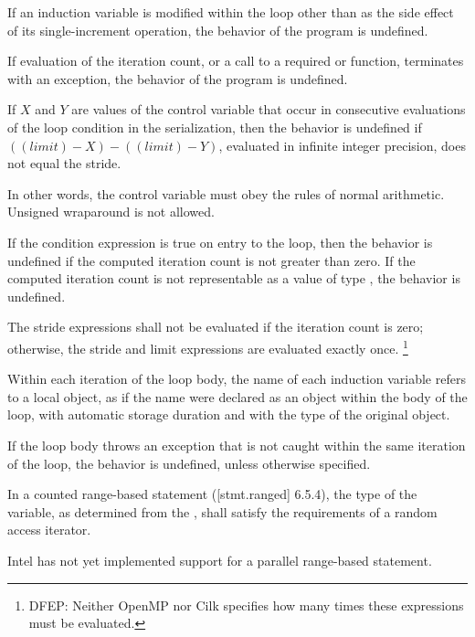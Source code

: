 
\pnum
If an induction variable is modified within the loop
other than as the side effect of its single-increment operation,
the behavior of the program is undefined.%

\begin{cpp}
If evaluation of the iteration count,
or a call to a required
or
function,
terminates with an exception,
the behavior of the program is undefined.
\end{cpp}

\pnum
If $X$ and $Y$ are values of the control variable
that occur in consecutive evaluations of the loop condition
in the serialization,
then the behavior is undefined if
$((limit) - X) - ((limit) - Y)$,
evaluated in infinite integer precision,
does not equal the stride.

\begin{note}
In other words, the control variable must obey the rules of normal arithmetic.
Unsigned wraparound is not allowed.
\end{note}

\pnum
If the condition expression is true on entry to the loop,
then the behavior is undefined
if the computed iteration count is not greater than zero.
If the computed iteration count is not representable
as a value of type
,
the behavior is undefined.


\pnum
The stride expressions shall not be evaluated if the iteration count is zero;
otherwise,
the stride and limit expressions are evaluated exactly once.%
\footnote{DFEP:
Neither OpenMP nor Cilk specifies
how many times these expressions must be evaluated.
}

\pnum
Within each iteration of the loop body,
the name of each induction variable refers to a local object,
as if the name were declared as an object within the body of the loop,
with automatic storage duration and with the type of the original object.
\begin{cpp}
If the loop body throws an exception
that is not caught within the same iteration of the loop,
the behavior is undefined, unless otherwise specified.
\end{cpp}

\begin{cpp}
\pnum
In a counted range-based
statement ([stmt.ranged] 6.5.4),
the type of the
variable,
as determined from the
,
shall satisfy the requirements of a random access iterator.
\begin{note}
Intel has not yet implemented support for
a parallel range-based
statement.
\end{note}
\end{cpp}
